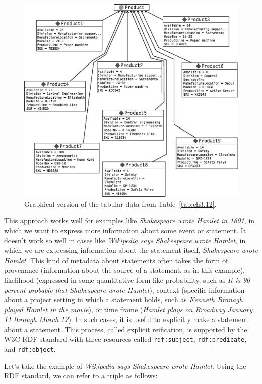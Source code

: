 \begin{figure}
    \centering
    \includegraphics[width=5.0in]{media/ch3/f03-07-9780123859655.eps}
    \caption{Graphical version of the tabular data from Table~\ref{tab:ch3.12}.}
    \label{fig:ch3.7}
\end{figure}


This approach works well for examples like \emph{Shakespeare wrote
Hamlet in 1601}, in which we want to express more information about some
event or statement. It doesn't work so well in cases like
\emph{Wikipedia says Shakespeare wrote Hamlet}, in which we are
expressing information about the statement itself, \emph{Shakespeare
wrote Hamlet}. This kind of metadata about statements often takes the
form of provenance (information about the source of a statement, as in
this example), likelihood (expressed in some quantitative form like
probability, such as \emph{It is 90 percent probable that Shakespeare
wrote Hamlet}), context (specific information about a project setting in
which a statement holds, such as \emph{Kenneth Branagh played Hamlet in
the movie}), or time frame (\emph{Hamlet plays on Broadway January 11
through March 12}). In such cases, it is useful to explicitly make a
statement about a statement. This process, called explicit reification,
is supported by the W3C RDF standard with three resources called
\texttt{rdf:subject}, \texttt{rdf:predicate}, and \texttt{rdf:object}.

Let's take the example of \emph{Wikipedia says Shakespeare wrote
Hamlet}. Using the RDF standard, we can refer to a triple as follows:

